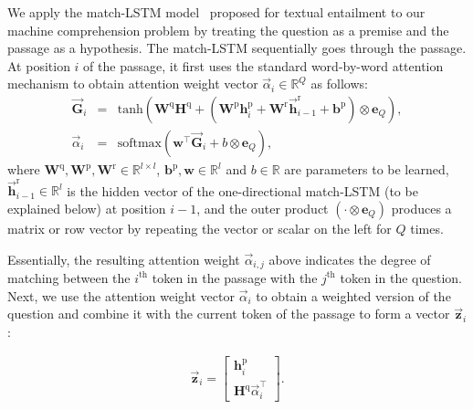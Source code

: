 \documentclass{article} \usepackage{iclr2017_conference,times}
\def\ignore#1{}
\begin{document}
We apply the match-LSTM model~\citep{wang2015learning:NAACL2016} proposed for textual entailment to our machine comprehension problem by treating the question as a premise and the passage as a hypothesis.
The match-LSTM sequentially goes through the passage.
At position $i$ of the passage, it first uses the standard word-by-word attention mechanism to obtain 
attention weight vector $\overrightarrow{\alpha}_i \in \mathbb{R}^Q$ as follows:
\begin{eqnarray}
\nonumber
\overrightarrow{\mathbf{G}}_i & = & \text{tanh}(\mathbf{W}^{\text{q}} \mathbf{H}^{\text{q}} + (\mathbf{W}^{\text{p}} \mathbf{h}^{\text{p}}_i + \mathbf{W}^{\text{r}} \overrightarrow{\mathbf{h}}^{\text{r}}_{i-1} + \mathbf{b}^{\text{p}}) \otimes \mathbf{e}_Q ), \\
\label{eqn:alpha}
\overrightarrow{\alpha}_i & = & \text{softmax}(\mathbf{w}^\intercal \overrightarrow{\mathbf{G}}_i + b \otimes \mathbf{e}_Q),
\end{eqnarray}
where $\mathbf{W}^{\text{q}}, \mathbf{W}^{\text{p}}, \mathbf{W}^{\text{r}}\in \mathbb{R}^{l \times l}$, $\mathbf{b}^{\text{p}}, \mathbf{w} \in \mathbb{R}^l$ and $b \in \mathbb{R}$ are parameters to be learned, $\overrightarrow{\mathbf{h}}^{\text{r}}_{i-1} \in \mathbb{R}^l$ is the hidden vector of the one-directional match-LSTM (to be explained below) at position $i-1$, and the outer product $(\cdot \otimes \mathbf{e}_Q)$ produces a matrix or row vector by repeating the vector or scalar on the left for $Q$ times.


Essentially, the resulting attention weight $\overrightarrow{\alpha}_{i, j}$ above indicates the degree of matching between the $i^\text{th}$ token in the passage with the $j^\text{th}$ token in the question.
Next, we use the attention weight vector $\overrightarrow{\alpha}_i$ to obtain a weighted version of the question and combine it with the current token of the passage to form a vector $\overrightarrow{\mathbf{z}}_i$:
\ignore{
\begin{eqnarray}
\label{eqn:zh}
\overrightarrow{\mathbf{z}}_i  =  \begin{bmatrix}
\textbf{h}^\text{p}_i \\
\overrightarrow{\bar{\mathbf{h}}}^\text{q}_i
\end{bmatrix}, &
\overrightarrow{\bar{\mathbf{h}}}^\text{q}_i = \textbf{H}^\text{q} \overrightarrow{\alpha}_i^{\intercal}.
\end{eqnarray}
}

\begin{eqnarray}
\label{eqn:zh}
\overrightarrow{\mathbf{z}}_i  =  \begin{bmatrix}
\textbf{h}^\text{p}_i \\
\textbf{H}^\text{q} \overrightarrow{\alpha}_i^{\intercal}
\end{bmatrix}.
\end{eqnarray}
\end{document}
